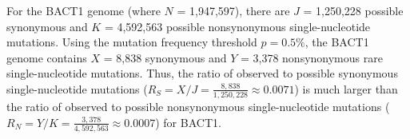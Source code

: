 For the BACT1 genome
(where $N$ = 1,947,597),
there are $J$ = 1,250,228 possible synonymous and
$K$ = 4,592,563 possible nonsynonymous single-nucleotide mutations.
%
Using the mutation frequency threshold $p = 0.5\%$,
the BACT1 genome contains
$X$ = 8,838 synonymous and
$Y$ = 3,378 nonsynonymous rare single-nucleotide mutations.
%
Thus, the ratio of observed to possible synonymous single-nucleotide mutations
($R_S = X / J = \frac{8,838}{1,250,228}
\approx 0.0071$)
is much larger than the ratio of observed to possible nonsynonymous single-nucleotide mutations
($R_N = Y / K = \frac{3,378}{4,592,563}
\approx 0.0007$)
for BACT1.
\endinput
